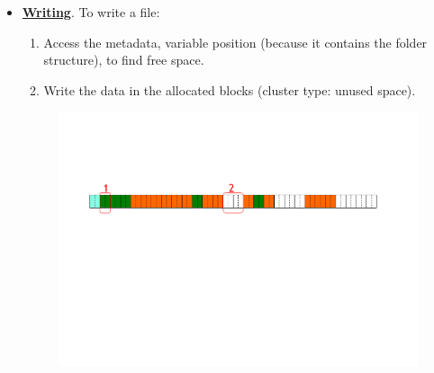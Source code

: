 \begin{itemize}
    \item \underline{\textbf{Writing}}. To write a file:
    \begin{enumerate}
        \item Access the metadata, variable position (because it contains the folder structure), to find free space.
        \item Write the data in the allocated blocks (cluster type: unused space).        
    \end{enumerate}
    \begin{figure}[!htp]
        \centering
        \includegraphics[width=\textwidth]{img/files-3.pdf}
    \end{figure}


\end{itemize}
